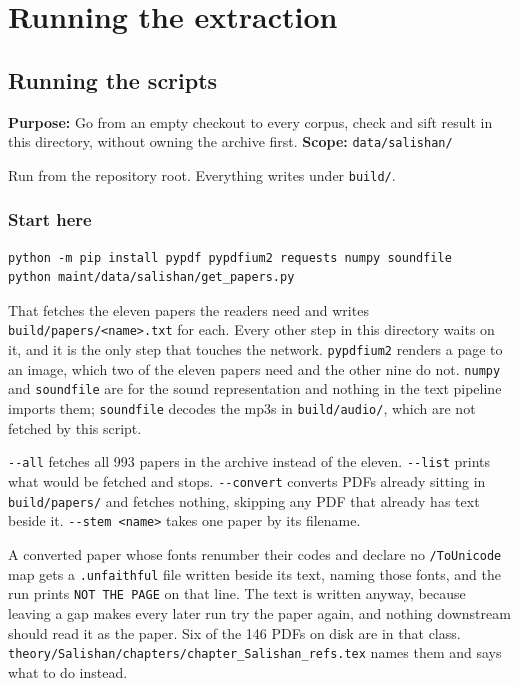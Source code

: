 \chapter{Running the extraction}

\section{Running the scripts}

\textbf{Purpose:} Go from an empty checkout to every corpus, check and sift result in this directory, without owning the archive first. \textbf{Scope:} \texttt{data/\allowbreak{}salishan/\allowbreak{}}

Run from the repository root. Everything writes under \texttt{build/\allowbreak{}}.

\subsection{Start here}

\begin{lstlisting}[breaklines=true,breakatwhitespace=false,basicstyle=\ttfamily\small]
python -m pip install pypdf pypdfium2 requests numpy soundfile
python maint/data/salishan/get_papers.py
\end{lstlisting}

That fetches the eleven papers the readers need and writes \texttt{build/\allowbreak{}papers/\allowbreak{}<name>.\allowbreak{}txt} for each. Every other step in this directory waits on it, and it is the only step that touches the network. \texttt{pypdfium2} renders a page to an image, which two of the eleven papers need and the other nine do not. \texttt{numpy} and \texttt{soundfile} are for the sound representation and nothing in the text pipeline imports them; \texttt{soundfile} decodes the mp3s in \texttt{build/\allowbreak{}audio/\allowbreak{}}, which are not fetched by this script.

\texttt{-\allowbreak{}-\allowbreak{}all} fetches all 993 papers in the archive instead of the eleven. \texttt{-\allowbreak{}-\allowbreak{}list} prints what would be fetched and stops. \texttt{-\allowbreak{}-\allowbreak{}convert} converts PDFs already sitting in \texttt{build/\allowbreak{}papers/\allowbreak{}} and fetches nothing, skipping any PDF that already has text beside it. \texttt{-\allowbreak{}-\allowbreak{}stem <name>} takes one paper by its filename.

A converted paper whose fonts renumber their codes and declare no \texttt{/\allowbreak{}To\allowbreak{}Unicode} map gets a \texttt{.\allowbreak{}unfaithful} file written beside its text, naming those fonts, and the run prints \texttt{NOT THE PAGE} on that line. The text is written anyway, because leaving a gap makes every later run try the paper again, and nothing downstream should read it as the paper. Six of the 146 PDFs on disk are in that class. \texttt{theory/\allowbreak{}Salishan/\allowbreak{}chapters/\allowbreak{}chapter\_\allowbreak{}Salishan\_\allowbreak{}refs.\allowbreak{}tex} names them and says what to do instead.

